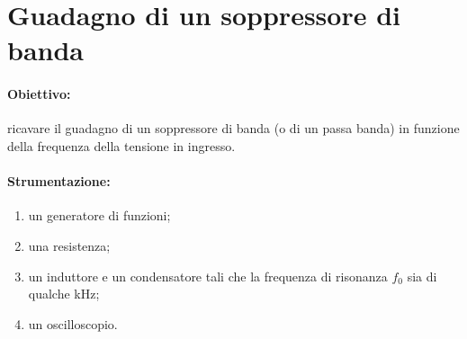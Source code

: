 \section{Guadagno di un soppressore di banda}

\paragraph{Obiettivo:} ricavare il guadagno di un soppressore di banda (o di un passa banda) in funzione della frequenza della tensione in ingresso.

\paragraph{Strumentazione:} 
\begin{enumerate}
    \item un generatore di funzioni;
    \item una resistenza;
    \item un induttore e un condensatore tali che la frequenza di risonanza $f_0$ sia di qualche kHz;
    \item un oscilloscopio.
\end{enumerate}

